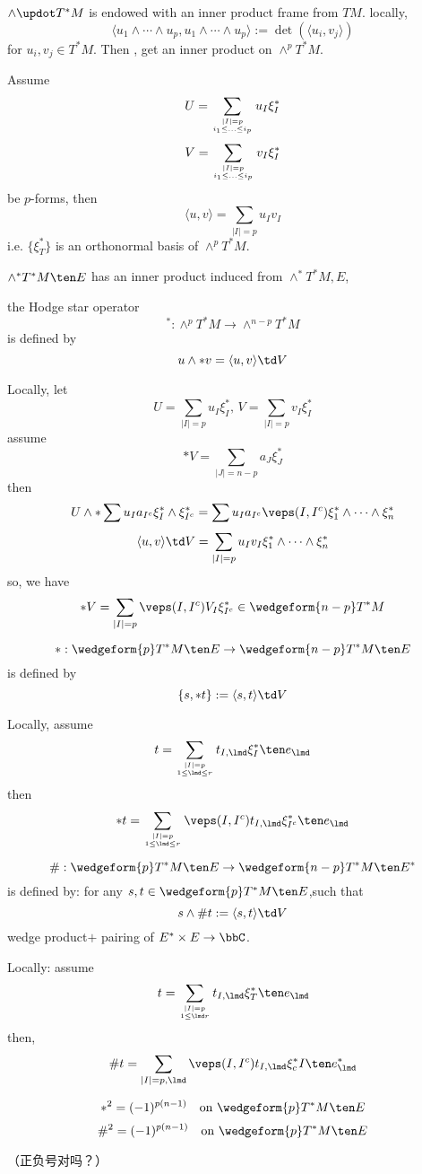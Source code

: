 $\wedge\updot T^*M$ is endowed with an inner product frame from $TM$.
locally, 
$$\langle u_1\wedge\cdots\wedge u_p,
          u_1\wedge\cdots\wedge u_p\rangle
:=\det(\langle u_i,v_j\rangle)
$$
for $u_i,v_j\in T^*M$. Then , get an inner product on $\wedge^pT^*M$.

Assume 
$$U=\sum_{|I|=p\atop i_1\leq...\leq i_p}
  u_I\xi_I^*
$$
$$V=\sum_{|I|=p\atop i_1\leq...\leq i_p}
  v_I\xi_I^*
$$
be $p$-forms, then 
$$\langle u,v\rangle=\sum_{|I|=p}u_Iv_I$$
i.e. $\{\xi^*_T\}$ is an orthonormal basis of $\wedge^pT^*M$.

$\wedge^*T^*M\ten E$ has an inner product induced from $\wedge^*T^*M,E$,

\begin{definition}
the Hodge star operator
$$^*:\wedge^pT^*M\to\wedge^{n-p}T^*M$$
is defined by 
$$u\wedge*v=\langle u,v\rangle\td V$$
\end{definition}
Locally, let 
$$U=\sum_{|I|=p}u_I\xi_I^*,\,V=\sum_{|I|=p}v_I\xi_I^*$$
assume 
$$*V=\sum_{|J|=n-p}a_J\xi_J^*$$
then
$$U\wedge*\sum u_I a_{I^c}\xi_I^*\wedge\xi_{I^c}^*
=\sum u_Ia_{I^c}\veps(I,I^c)\xi_1^*\wedge\cdots\wedge\xi_n^*
$$
$$
  \langle u,v\rangle\td V=\sum_{|I|=p}u_Iv_I\xi_1^*\wedge\cdots\wedge\xi_n^*
$$
so, we have
$$
  *V=\sum_{|I|=p}\veps(I,I^c)V_I\xi_{I^c}^*
\in \wedgeform{n-p}T^*M
$$

\begin{definition}
$$*:\wedgeform{p}T^*M\ten E\to\wedgeform{n-p}T^*M\ten E$$
is defined by 
$$\{s,*t\}:=\langle s,t\rangle\td V$$
\end{definition}

Locally, assume 
$$t=\sum_{|I|=p\atop1\leq\lmd\leq r}
t_{I,\lmd}\xi_I^*\ten e_{\lmd}
$$
then
$$
  *t=
  \sum_{|I|=p\atop 1\leq\lmd\leq r}
  \veps(I,I^c)
  t_{I,\lmd}\xi_{I^c}^*\ten e_{\lmd}
$$

\begin{definition}
$$\#:\wedgeform{p}T^*M\ten E\to\wedgeform{n-p}T^*M\ten E^*$$
is defined by: for any $s,t\in \wedgeform{p}T^*M\ten E$,such that
$$s\wedge\# t:=\langle s,t\rangle\td V$$
wedge product$+$ pairing of $E^*\times E\to\bbC$.
\end{definition}
Locally: assume 
$$t=\sum_{|I|=p\atop 1\leq\lmd r}
t_{I,\lmd}\xi_T^*\ten e_{\lmd}
$$
then, 
$$\#t=\sum_{|I|=p,\lmd}
\veps(I,I^c)t_{I,\lmd}\xi_c^*I\ten e_\lmd^*
$$

\begin{prop}
$$*^2=(-1)^{p(n-1)}\quad\text{on } \wedgeform{p}T^*M\ten E$$
$$\#^2=(-1)^{p(n-1)}\quad\text{on } \wedgeform{p}T^*M\ten E$$
\end{prop}
（正负号对吗？）

